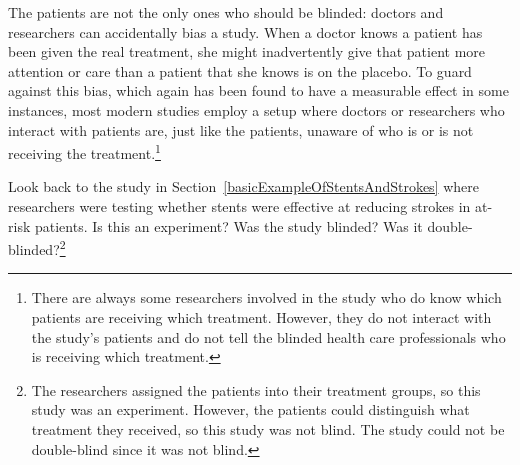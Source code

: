The patients are not the only ones who should be blinded: doctors and researchers can accidentally bias a study. When a doctor knows a patient has been given the real treatment, she might inadvertently give that patient more attention or care than a patient that she knows is on the placebo. To guard against this bias, which again has been found to have a measurable effect in some instances, most modern studies employ a  setup where doctors or researchers who interact with patients are, just like the patients, unaware of who is or is not receiving the treatment.\footnote{There are always some researchers involved in the study who do know which patients are receiving which treatment. However, they do not interact with the study's patients and do not tell the blinded health care professionals who is receiving which treatment.}

\begin{exercise}
Look back to the study in Section~\ref{basicExampleOfStentsAndStrokes} where researchers were testing whether stents were effective at reducing strokes in at-risk patients. Is this an experiment? Was the study blinded? Was it double-blinded?\footnote{The researchers assigned the patients into their treatment groups, so this study was an experiment. However, the patients could distinguish what treatment they received, so this study was not blind. The study could not be double-blind since it was not blind.}
\end{exercise}



